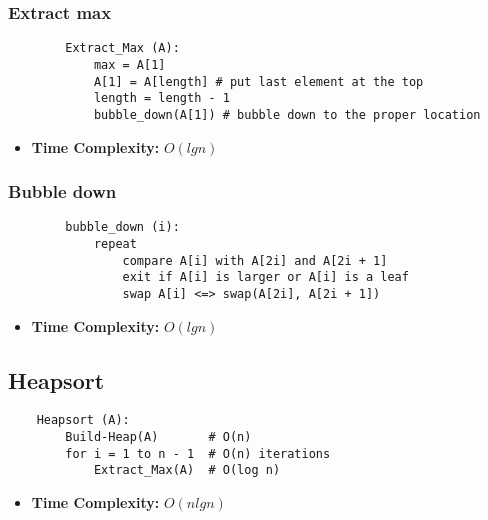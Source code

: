     \subsubsection{Extract max}
    \begin{definition}
        \begin{lstlisting}
        Extract_Max (A): 
            max = A[1]
            A[1] = A[length] # put last element at the top
            length = length - 1
            bubble_down(A[1]) # bubble down to the proper location
        \end{lstlisting}
        \begin{itemize}
            \item \textbf{Time Complexity:} $O(lg n)$
        \end{itemize}
    \end{definition}

    \subsubsection{Bubble down}
    \begin{definition}
        \begin{lstlisting}
        bubble_down (i):
            repeat
                compare A[i] with A[2i] and A[2i + 1]
                exit if A[i] is larger or A[i] is a leaf
                swap A[i] <=> swap(A[2i], A[2i + 1])
        \end{lstlisting}
        \begin{itemize}
            \item \textbf{Time Complexity:} $O(lg n)$
        \end{itemize}

    \end{definition}

\subsection{Heapsort}
\begin{definition}
    \begin{lstlisting}
    Heapsort (A):
        Build-Heap(A)       # O(n)
        for i = 1 to n - 1  # O(n) iterations
            Extract_Max(A)  # O(log n)
    \end{lstlisting}
    \begin{itemize}
        \item \textbf{Time Complexity:} $O(nlg n)$
    \end{itemize}

\end{definition}

